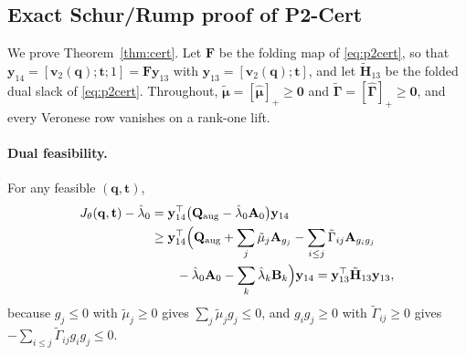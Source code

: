 \subsection{Exact Schur/Rump proof of P2-Cert}\label{app:p2cert}
We prove Theorem~\ref{thm:cert}. Let $\mathbf F$ be the folding map of \eqref{eq:p2cert}, so that $\mathbf y_{14}=[\mathbf v_2(\mathbf q);\mathbf t;1]=\mathbf F\mathbf y_{13}$ with $\mathbf y_{13}=[\mathbf v_2(\mathbf q);\mathbf t]$, and let $\tilde{\mathbf H}_{13}$ be the folded dual slack of \eqref{eq:p2cert}. Throughout, $\tilde{\boldsymbol\mu}=[\hat{\boldsymbol\mu}]_+\ge\mathbf 0$ and $\tilde{\boldsymbol\Gamma}=[\hat{\boldsymbol\Gamma}]_+\ge\mathbf 0$, and every Veronese row vanishes on a rank-one lift.

\paragraph{Dual feasibility.} For any feasible $(\mathbf q,\mathbf t)$,
\begin{equation}
\begin{aligned}
J_\theta(\mathbf q,\mathbf t)-\hat\lambda_0
&=\mathbf y_{14}^\top\big(\mathbf Q_{\rm aug}-\hat\lambda_0\mathbf A_0\big)\mathbf y_{14}\\
&\ge\mathbf y_{14}^\top\Big(\mathbf Q_{\rm aug}+\sum_j\tilde\mu_j\mathbf A_{g_j}-\sum_{i\le j}\tilde\Gamma_{ij}\mathbf A_{g_ig_j}\\
&\qquad-\hat\lambda_0\mathbf A_0-\sum_k\hat\lambda_k\mathbf B_k\Big)\mathbf y_{14}
=\mathbf y_{13}^\top\tilde{\mathbf H}_{13}\mathbf y_{13},
\end{aligned}
\label{eq:app_dual}
\end{equation}
because $g_j\le0$ with $\tilde\mu_j\ge0$ gives $\sum_j\tilde\mu_j g_j\le0$, and $g_ig_j\ge0$ with $\tilde\Gamma_{ij}\ge0$ gives $-\sum_{i\le j}\tilde\Gamma_{ij}g_ig_j\le0$.


